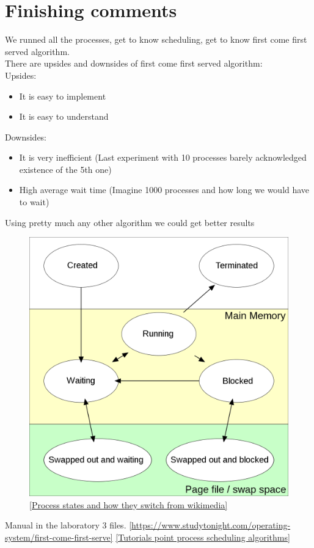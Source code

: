 \documentclass{article}
\begin{document}
\section{Finishing comments}
We runned all the processes, get to know scheduling, get to know first come
first served algorithm. \\
There are upsides and downsides of first come first served algorithm:
\\
Upsides:
\begin{itemize}
	\item It is easy to implement
	\item It is easy to understand
\end{itemize}
Downsides:
\begin{itemize}
	\item It is very inefficient (Last experiment with 10 processes barely
		acknowledged existence of the 5th one)
	\item High average wait time (Imagine 1000 processes and how long we
		would have to wait)
\end{itemize}
Using pretty much any other algorithm we could get better results \cite{First
come first serve}
\begin{figure}[H]
	\caption{\href{https://commons.wikimedia.org/wiki/File:Process_states.svg}{[Process
	states and how they switch from wikimedia]}}
	\includegraphics[width=\textwidth]{procestates}
\end{figure}

\begin{thebibliography}{9}
	 Manual in the laboratory 3 files.
	\href{https://www.studytonight.com/operating-system/first-come-first-serve}{[https://www.studytonight.com/operating-system/first-come-first-serve]}
	\href{https://www.tutorialspoint.com/operating_system/os_process_scheduling_algorithms.htm}{[Tutorials
point process scheduling algorithms]}
\end{thebibliography}
\end{document}
